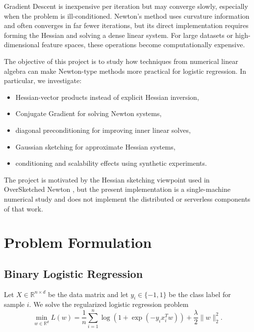 \documentclass[12pt,a4paper]{report}
\begin{document}
Gradient Descent is inexpensive per iteration but may converge slowly, especially when the problem is ill-conditioned. Newton's method uses curvature information and often converges in far fewer iterations, but its direct implementation requires forming the Hessian and solving a dense linear system. For large datasets or high-dimensional feature spaces, these operations become computationally expensive.

The objective of this project is to study how techniques from numerical linear algebra can make Newton-type methods more practical for logistic regression. In particular, we investigate:

\begin{itemize}
    \item Hessian-vector products instead of explicit Hessian inversion,
    \item Conjugate Gradient for solving Newton systems,
    \item diagonal preconditioning for improving inner linear solves,
    \item Gaussian sketching for approximate Hessian systems,
    \item conditioning and scalability effects using synthetic experiments.
\end{itemize}

The project is motivated by the Hessian sketching viewpoint used in OverSketched Newton \cite{oversketched}, but the present implementation is a single-machine numerical study and does not implement the distributed or serverless components of that work.

\chapter{Problem Formulation}

\section{Binary Logistic Regression}

Let \(X\in\mathbb{R}^{n\times d}\) be the data matrix and let \(y_i\in\{-1,1\}\) be the class label for sample \(i\). We solve the regularized logistic regression problem
\begin{equation}
    \min_{w\in\mathbb{R}^d} L(w)
    =
    \frac{1}{n}\sum_{i=1}^{n}\log\left(1+\exp(-y_i x_i^T w)\right)
    +
    \frac{\lambda}{2}\|w\|_2^2.
    \label{eq:loss}
\end{equation}
\end{document}
